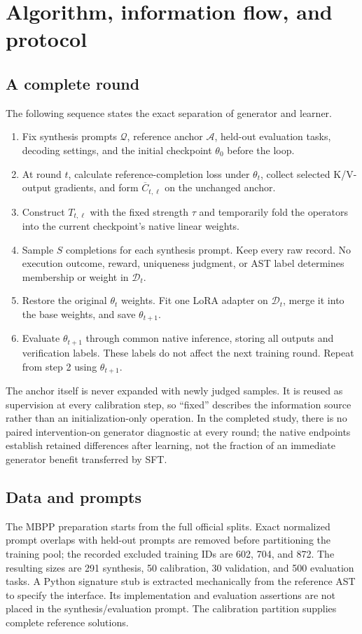 \documentclass{article}
\newcommand{\cA}{\mathcal A}
\newcommand{\cD}{\mathcal D}
\newcommand{\cQ}{\mathcal Q}
\newcommand{\Cbar}{\overline C}
\begin{document}
\FloatBarrier
\section{Algorithm, information flow, and protocol}
\label{app:protocol}
\subsection{A complete round}
The following sequence states the exact separation of generator and learner.
\begin{enumerate}
\item Fix synthesis prompts $\cQ$, reference anchor $\cA$, held-out evaluation tasks, decoding settings, and the initial checkpoint $\theta_0$ before the loop.
\item At round $t$, calculate reference-completion loss under $\theta_t$, collect selected K/V-output gradients, and form $\Cbar_{t,\ell}$ on the unchanged anchor.
\item Construct $T_{t,\ell}$ with the fixed strength $\tau$ and temporarily fold the operators into the current checkpoint's native linear weights.
\item Sample $S$ completions for each synthesis prompt. Keep every raw record. No execution outcome, reward, uniqueness judgment, or AST label determines membership or weight in $\cD_t$.
\item Restore the original $\theta_t$ weights. Fit one LoRA adapter on $\cD_t$, merge it into the base weights, and save $\theta_{t+1}$.
\item Evaluate $\theta_{t+1}$ through common native inference, storing all outputs and verification labels. These labels do not affect the next training round. Repeat from step 2 using $\theta_{t+1}$.
\end{enumerate}
The anchor itself is never expanded with newly judged samples. It is reused as supervision at every calibration step, so ``fixed'' describes the information source rather than an initialization-only operation. In the completed study, there is no paired intervention-on generator diagnostic at every round; the native endpoints establish retained differences after learning, not the fraction of an immediate generator benefit transferred by SFT.

\subsection{Data and prompts}
The MBPP preparation starts from the full official splits. Exact normalized prompt overlaps with held-out prompts are removed before partitioning the training pool; the recorded excluded training IDs are 602, 704, and 872. The resulting sizes are 291 synthesis, 50 calibration, 30 validation, and 500 evaluation tasks. A Python signature stub is extracted mechanically from the reference AST to specify the interface. Its implementation and evaluation assertions are not placed in the synthesis/evaluation prompt. The calibration partition supplies complete reference solutions.
\end{document}
